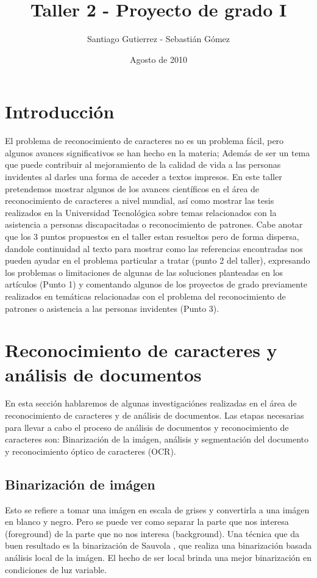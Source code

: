 \documentclass{article}
\begin{document}
\title {Taller 2 - Proyecto de grado I}
\author { Santiago Gutierrez - Sebastián Gómez }
\date {Agosto de 2010}
\maketitle

	\section{Introducción}
	El problema de reconocimiento de caracteres no es un problema fácil, pero algunos
	avances significativos se han hecho en la materia; Además de ser un tema que puede
	contribuir al mejoramiento de la calidad de vida a las personas invidentes al darles
	una forma de acceder a textos impresos.\newline
	En este taller pretendemos mostrar algunos de los avances científicos en el área
	de reconocimiento de caracteres a nivel mundial, así como mostrar las tesis
	realizados en la Universidad Tecnológica sobre temas relacionados con la asistencia
	a personas discapacitadas o reconocimiento de patrones. Cabe anotar que los 3 puntos
	propuestos en el taller estan resueltos pero de forma dispersa, dandole continuidad
	al texto para mostrar como las referencias encontradas nos pueden ayudar en el
	problema particular a tratar (punto 2 del taller), expresando los problemas o
	limitaciones de algunas de las soluciones planteadas en los artículos (Punto 1) y
	comentando algunos de los proyectos de grado previamente realizados en temáticas
	relacionadas con el problema del reconocimiento de patrones o asistencia a las
	personas invidentes (Punto 3).
	
	\section{Reconocimiento de caracteres y análisis de documentos}
	En esta sección hablaremos de algunas investigaciónes realizadas en el área
	de reconocimiento de caracteres y de análisis de documentos.
	Las etapas necesarias para llevar a cabo el proceso de análisis de documentos
	y reconocimiento de caracteres son: Binarización de la imágen, análisis y
	segmentación del documento y reconocimiento óptico de caracteres (OCR).
	
	\subsection{Binarización de imágen}
	Esto se refiere a tomar una imágen en escala de grises y convertirla a una 
	imágen en blanco y negro. Pero se puede ver como separar la parte que nos interesa
	(foreground) de la parte que no nos interesa (background).
	Una técnica que da buen resultado es la binarización de Sauvola \cite{ocropus2},
	que realiza una binarización basada análisis local de la imágen. El hecho de
	ser local brinda una mejor binarización en condiciones de luz variable.
	
\end{document}
